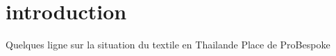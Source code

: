 \chapter*{introduction}
Quelques ligne sur la situation du textile en Thailande
Place de ProBespoke

